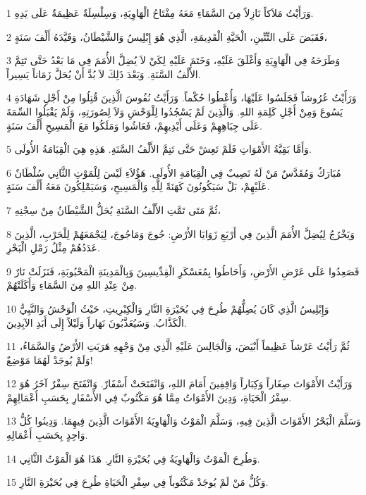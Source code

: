 \par 1 وَرَأَيْتُ مَلاَكاً نَازِلاً مِنَ السَّمَاءِ مَعَهُ مِفْتَاحُ الْهَاوِيَةِ، وَسِلْسِلَةٌ عَظِيمَةٌ عَلَى يَدِهِ.
\par 2 فَقَبَضَ عَلَى التِّنِّينِ، الْحَيَّةِ الْقَدِيمَةِ، الَّذِي هُوَ إِبْلِيسُ وَالشَّيْطَانُ، وَقَيَّدَهُ أَلْفَ سَنَةٍ،
\par 3 وَطَرَحَهُ فِي الْهَاوِيَةِ وَأَغْلَقَ عَلَيْهِ، وَخَتَمَ عَلَيْهِ لِكَيْ لاَ يُضِلَّ الأُمَمَ فِي مَا بَعْدُ حَتَّى تَتِمَّ الأَلْفُ السَّنَةِ. وَبَعْدَ ذَلِكَ لاَ بُدَّ أَنْ يُحَلَّ زَمَاناً يَسِيراً.
\par 4 وَرَأَيْتُ عُرُوشاً فَجَلَسُوا عَلَيْهَا، وَأُعْطُوا حُكْماً. وَرَأَيْتُ نُفُوسَ الَّذِينَ قُتِلُوا مِنْ أَجْلِ شَهَادَةِ يَسُوعَ وَمِنْ أَجْلِ كَلِمَةِ اللهِ. وَالَّذِينَ لَمْ يَسْجُدُوا لِلْوَحْشِ وَلاَ لِصُورَتِهِ، وَلَمْ يَقْبَلُوا السِّمَةَ عَلَى جِبَاهِهِمْ وَعَلَى أَيْدِيهِمْ، فَعَاشُوا وَمَلَكُوا مَعَ الْمَسِيحِ أَلْفَ سَنَةٍ.
\par 5 وَأَمَّا بَقِيَّةُ الأَمْوَاتِ فَلَمْ تَعِشْ حَتَّى تَتِمَّ الأَلْفُ السَّنَةِ. هَذِهِ هِيَ الْقِيَامَةُ الأُولَى.
\par 6 مُبَارَكٌ وَمُقَدَّسٌ مَنْ لَهُ نَصِيبٌ فِي الْقِيَامَةِ الأُولَى. هَؤُلاَءِ لَيْسَ لِلْمَوْتِ الثَّانِي سُلْطَانٌ عَلَيْهِمْ، بَلْ سَيَكُونُونَ كَهَنَةً لِلَّهِ وَالْمَسِيحِ، وَسَيَمْلِكُونَ مَعَهُ أَلْفَ سَنَةٍ.
\par 7 ثُمَّ مَتَى تَمَّتِ الأَلْفُ السَّنَةِ يُحَلُّ الشَّيْطَانُ مِنْ سِجْنِهِ،
\par 8 وَيَخْرُجُ لِيُضِلَّ الأُمَمَ الَّذِينَ فِي أَرْبَعِ زَوَايَا الأَرْضِ: جُوجَ وَمَاجُوجَ، لِيَجْمَعَهُمْ لِلْحَرْبِ، الَّذِينَ عَدَدُهُمْ مِثْلُ رَمْلِ الْبَحْرِ.
\par 9 فَصَعِدُوا عَلَى عَرْضِ الأَرْضِ، وَأَحَاطُوا بِمُعَسْكَرِ الْقِدِّيسِينَ وَبِالْمَدِينَةِ الْمَحْبُوبَةِ، فَنَزَلَتْ نَارٌ مِنْ عِنْدِ اللهِ مِنَ السَّمَاءِ وَأَكَلَتْهُمْ.
\par 10 وَإِبْلِيسُ الَّذِي كَانَ يُضِلُّهُمْ طُرِحَ فِي بُحَيْرَةِ النَّارِ وَالْكِبْرِيتِ، حَيْثُ الْوَحْشُ وَالنَّبِيُّ الْكَذَّابُ. وَسَيُعَذَّبُونَ نَهَاراً وَلَيْلاً إِلَى أَبَدِ الآبِدِينَ.
\par 11 ثُمَّ رَأَيْتُ عَرْشاً عَظِيماً أَبْيَضَ، وَالْجَالِسَ عَلَيْهِ الَّذِي مِنْ وَجْهِهِ هَرَبَتِ الأَرْضُ وَالسَّمَاءُ، وَلَمْ يُوجَدْ لَهُمَا مَوْضِعٌ!
\par 12 وَرَأَيْتُ الأَمْوَاتَ صِغَاراً وَكِبَاراً وَاقِفِينَ أَمَامَ اللهِ، وَانْفَتَحَتْ أَسْفَارٌ. وَانْفَتَحَ سِفْرٌ آخَرُ هُوَ سِفْرُ الْحَيَاةِ، وَدِينَ الأَمْوَاتُ مِمَّا هُوَ مَكْتُوبٌ فِي الأَسْفَارِ بِحَسَبِ أَعْمَالِهِمْ.
\par 13 وَسَلَّمَ الْبَحْرُ الأَمْوَاتَ الَّذِينَ فِيهِ، وَسَلَّمَ الْمَوْتُ وَالْهَاوِيَةُ الأَمْوَاتَ الَّذِينَ فِيهِمَا. وَدِينُوا كُلُّ وَاحِدٍ بِحَسَبِ أَعْمَالِهِ.
\par 14 وَطُرِحَ الْمَوْتُ وَالْهَاوِيَةُ فِي بُحَيْرَةِ النَّارِ. هَذَا هُوَ الْمَوْتُ الثَّانِي.
\par 15 وَكُلُّ مَنْ لَمْ يُوجَدْ مَكْتُوباً فِي سِفْرِ الْحَيَاةِ طُرِحَ فِي بُحَيْرَةِ النَّارِ.


